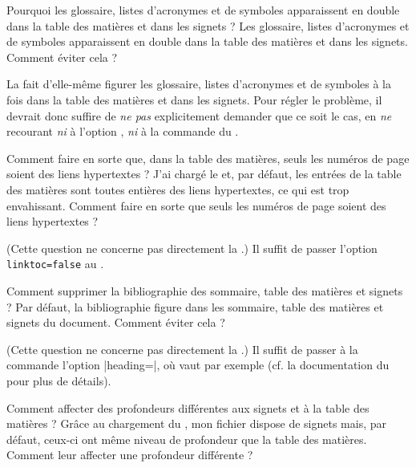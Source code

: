 \begin{dbfaq}{Pourquoi les glossaire, listes d'acronymes et de symboles
    apparaissent en double dans la table des matières et dans les signets ?}{}
  Les glossaire, listes d'acronymes et de symboles apparaissent en double dans
  la table des matières et dans les signets. Comment éviter cela ?%
\end{dbfaq}

La \yatCl{} fait d'elle-même figurer les glossaire, listes d'acronymes et de
symboles à la fois dans la table des matières et dans les signets. Pour régler
le problème, il devrait donc suffire de \emph{ne pas} explicitement demander que
ce soit le cas, en \emph{ne} recourant \emph{ni} à l'option ,
\emph{ni} à la commande  du .

\begin{dbfaq}{Comment faire en sorte que, dans la table des matières, seuls
    les numéros de page soient des liens hypertextes ?}{}
  J'ai chargé le  et, par défaut, les entrées de la table des
  matières sont toutes entières des liens hypertextes, ce qui est trop
  envahissant. Comment faire en sorte que seuls les numéros de page soient des
  liens hypertextes ?
\end{dbfaq}

(Cette question ne concerne pas directement la \yatCl{}.) Il suffit de
passer l'option \lstinline|linktoc=false| au .

\begin{dbfaq}{Comment supprimer la bibliographie des sommaire, table des
    matières et signets ?}{}
  Par défaut, la bibliographie figure dans les sommaire, table des matières et
  signets du document. Comment éviter cela ?
\end{dbfaq}

(Cette question ne concerne pas directement la \yatCl{}.) Il suffit de
passer à la commande  l'option
|heading=|, où  vaut par exemple
 (cf. la documentation du  pour plus
de détails).

\begin{dbfaq}{Comment affecter des profondeurs différentes aux signets et à la
    table des matières ?}{}
  Grâce au chargement du , mon fichier 
  dispose de signets mais, par défaut, ceux-ci ont même niveau de profondeur que
  la table des matières. Comment leur affecter une profondeur différente ?
\end{dbfaq}

